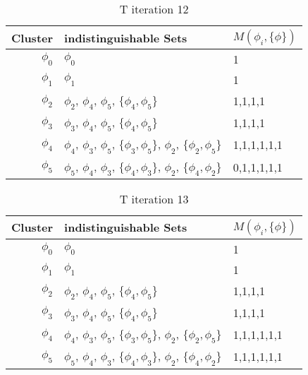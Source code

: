 \documentclass{article}
\begin{document}
				\begin{table}[h!]
				  \begin{center}
				    \caption{T iteration 12}
				    \label{tab:table14}
				    \begin{tabular}{r|l|l}
				      Cluster & indistinguishable Sets & $M(\phi_i, \{\phi\})$\\
				      \hline
				      $\phi_0$ & $\phi_0$ & 1\\
				      $\phi_1$ & $\phi_1$ & 1\\
				      $\phi_2$ & $\phi_2$, $\phi_4$, $\phi_5$, $\{\phi_4,\phi_5\}$ & 1,1,1,1\\
				      $\phi_3$ & $\phi_3$, $\phi_4$, $\phi_5$, $\{\phi_4,\phi_5\}$ & 1,1,1,1\\
				      $\phi_4$ & $\phi_4$, $\phi_3$, $\phi_5$, $\{\phi_3,\phi_5\}$, $\phi_2$, $\{\phi_2,\phi_5\}$ & 1,1,1,1,1,1\\
				      $\phi_5$ & $\phi_5$, $\phi_4$, $\phi_3$, $\{\phi_4,\phi_3\}$, $\phi_2$, $\{\phi_4,\phi_2\}$ & 0,1,1,1,1,1\\
				    \end{tabular}
				  \end{center}
				\end{table}

				\begin{table}[h!]
				  \begin{center}
				    \caption{T iteration 13}
				    \label{tab:table15}
				    \begin{tabular}{r|l|l}
				      Cluster & indistinguishable Sets & $M(\phi_i, \{\phi\})$\\
				      \hline
				      $\phi_0$ & $\phi_0$ & 1\\
				      $\phi_1$ & $\phi_1$ & 1\\
				      $\phi_2$ & $\phi_2$, $\phi_4$, $\phi_5$, $\{\phi_4,\phi_5\}$ & 1,1,1,1\\
				      $\phi_3$ & $\phi_3$, $\phi_4$, $\phi_5$, $\{\phi_4,\phi_5\}$ & 1,1,1,1\\
				      $\phi_4$ & $\phi_4$, $\phi_3$, $\phi_5$, $\{\phi_3,\phi_5\}$, $\phi_2$, $\{\phi_2,\phi_5\}$ & 1,1,1,1,1,1\\
				      $\phi_5$ & $\phi_5$, $\phi_4$, $\phi_3$, $\{\phi_4,\phi_3\}$, $\phi_2$, $\{\phi_4,\phi_2\}$ & 1,1,1,1,1,1\\
				    \end{tabular}
				  \end{center}
				\end{table}

				


		
	
\end{document}
